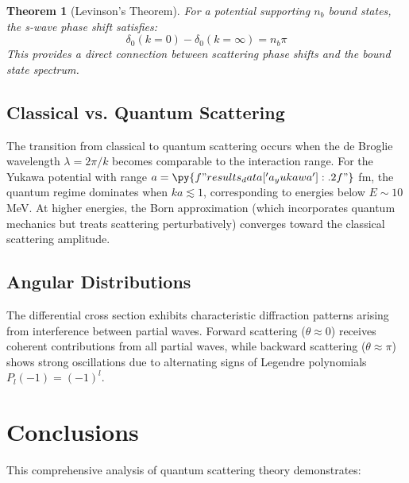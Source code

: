 \documentclass[a4paper, 11pt]{article}
\newtheorem{theorem}{Theorem}[section]
\begin{document}
\begin{theorem}[Levinson's Theorem]
For a potential supporting $n_b$ bound states, the s-wave phase shift satisfies:
\begin{equation}
\delta_0(k=0) - \delta_0(k=\infty) = n_b \pi
\end{equation}
This provides a direct connection between scattering phase shifts and the bound state spectrum.
\end{theorem}

\subsection{Classical vs. Quantum Scattering}

The transition from classical to quantum scattering occurs when the de Broglie wavelength
$\lambda = 2\pi/k$ becomes comparable to the interaction range. For the Yukawa potential with
range $a = \py{f"{results_data['a_yukawa']:.2f}"}$ fm, the quantum regime dominates when
$ka \lesssim 1$, corresponding to energies below $E \sim 10$ MeV. At higher energies, the
Born approximation (which incorporates quantum mechanics but treats scattering perturbatively)
converges toward the classical scattering amplitude.

\subsection{Angular Distributions}

The differential cross section exhibits characteristic diffraction patterns arising from
interference between partial waves. Forward scattering ($\theta \approx 0$) receives coherent
contributions from all partial waves, while backward scattering ($\theta \approx \pi$) shows
strong oscillations due to alternating signs of Legendre polynomials $P_l(-1) = (-1)^l$.

\section{Conclusions}

This comprehensive analysis of quantum scattering theory demonstrates:
\end{document}

